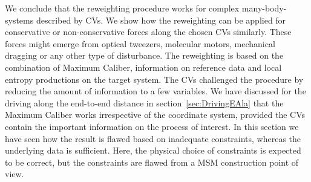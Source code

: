 We conclude that the reweighting procedure works for complex many-body-systems described by CVs. We show how the reweighting can be applied for conservative or non-conservative forces along the chosen CVs similarly. These forces might emerge from optical tweezers, molecular motors, mechanical dragging or any other type of disturbance. The reweighting is based on the combination of Maximum Caliber, information on reference data and local entropy productions on the target system. The CVs challenged the procedure by reducing the amount of information to a few variables. We have discussed for the driving along the end-to-end distance in section~\ref{sec:DrivingEAla} that the Maximum Caliber works irrespective of the coordinate system, provided the CVs contain the important information on the process of interest. In this section we have seen how the result is flawed based on inadequate constraints, whereas the underlying data is sufficient. Here, the physical choice of constraints is expected to be correct, but the constraints are flawed from a MSM construction point of view. 

% 
%  
%      
